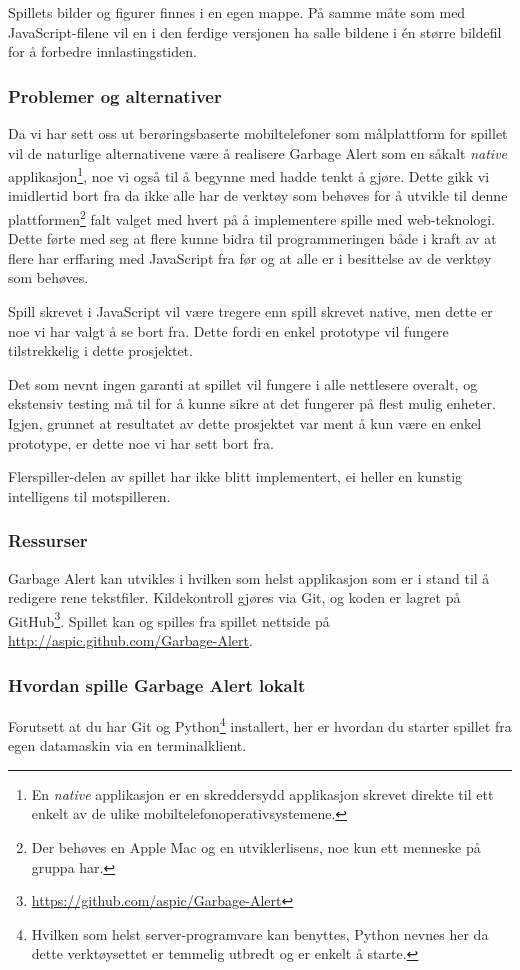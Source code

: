 Spillets bilder og figurer finnes i en egen mappe. På samme måte som med JavaScript-filene vil en i den ferdige versjonen ha salle bildene i én større bildefil for å forbedre innlastingstiden.


\subsubsection{Problemer og alternativer}
Da vi har sett oss ut berøringsbaserte mobiltelefoner som målplattform for spillet vil de naturlige alternativene være å realisere Garbage Alert som en såkalt \emph{native} applikasjon\footnote{En \emph{native} applikasjon er en skreddersydd applikasjon skrevet direkte til ett enkelt av de ulike mobiltelefonoperativsystemene.}, noe vi også til å begynne med hadde tenkt å gjøre. Dette gikk vi imidlertid bort fra da ikke alle har de verktøy som behøves for å utvikle til denne plattformen\footnote{Der behøves en Apple Mac og en utviklerlisens, noe kun ett menneske på gruppa har.} falt valget med hvert på å implementere spille med web-teknologi. Dette førte med seg at flere kunne bidra til programmeringen både i kraft av at flere har erffaring med JavaScript fra før og at alle er i besittelse av de verktøy som behøves.

Spill skrevet i JavaScript vil være tregere enn spill skrevet native, men dette er noe vi har valgt å se bort fra. Dette fordi en enkel prototype vil fungere tilstrekkelig i dette prosjektet.

Det som nevnt ingen garanti at spillet vil fungere i alle nettlesere overalt, og ekstensiv testing må til for å kunne sikre at det fungerer på flest mulig enheter. Igjen, grunnet at resultatet av dette prosjektet var ment å kun være en enkel prototype, er dette noe vi har sett bort fra.

Flerspiller-delen av spillet har ikke blitt implementert, ei heller en kunstig intelligens til motspilleren.


\subsubsection{Ressurser}
Garbage Alert kan utvikles i hvilken som helst applikasjon som er i stand til å redigere rene tekstfiler. Kildekontroll gjøres via Git, og koden er lagret på GitHub\footnote{\url{https://github.com/aspic/Garbage-Alert}}. Spillet kan og spilles fra spillet nettside på \url{http://aspic.github.com/Garbage-Alert}.

\subsubsection{Hvordan spille Garbage Alert lokalt}
Forutsett at du har Git og Python\footnote{Hvilken som helst server-programvare kan benyttes, Python nevnes her da dette verktøysettet er temmelig utbredt og er enkelt å starte.} installert, her er hvordan du starter spillet fra egen datamaskin via en terminalklient.

